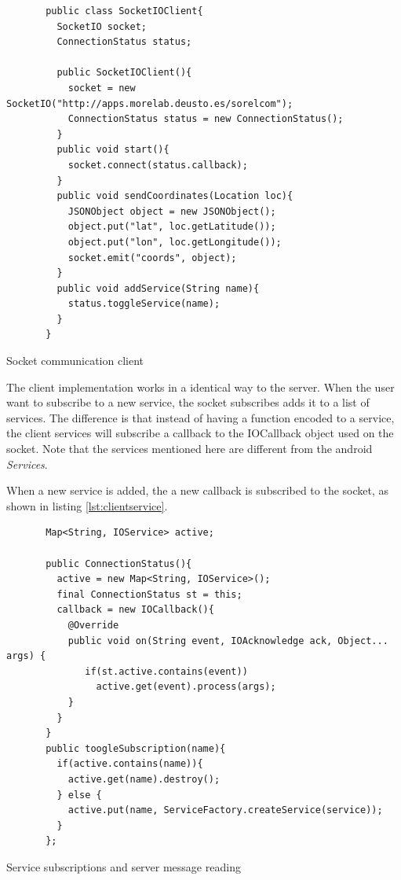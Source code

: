 \begin{listing}[ht]\centering
  \begin{minipage}{.8\textwidth}
    \begin{verbatim}
       public class SocketIOClient{
         SocketIO socket;      
         ConnectionStatus status;
        
         public SocketIOClient(){
           socket = new SocketIO("http://apps.morelab.deusto.es/sorelcom");
           ConnectionStatus status = new ConnectionStatus();
         }
         public void start(){
           socket.connect(status.callback);
         }
         public void sendCoordinates(Location loc){
           JSONObject object = new JSONObject();
           object.put("lat", loc.getLatitude());
           object.put("lon", loc.getLongitude());
           socket.emit("coords", object);
         }         
         public void addService(String name){
           status.toggleService(name);
         }
       }
    \end{verbatim}
  \end{minipage}
  \caption{Socket communication client}\label{lst:socketclient}
\end{listing}

The client implementation works in a identical way to the server. When the user want to subscribe to a new service, the socket subscribes adds it to a list of services. The difference is that instead of having a function encoded to a service, the client services will subscribe a callback to the IOCallback object used on the socket. Note that the services mentioned here are different from the android \textit{Services}.

When a new service is added, the a new callback is subscribed to the socket, as shown in listing \ref{lst:clientservice}.

\begin{listing}[ht]\centering
  \begin{minipage}{.8\textwidth}
    \begin{verbatim}
       Map<String, IOService> active;
       
       public ConnectionStatus(){
         active = new Map<String, IOService>();
         final ConnectionStatus st = this;
         callback = new IOCallback(){
           @Override
           public void on(String event, IOAcknowledge ack, Object... args) {
              if(st.active.contains(event))
                active.get(event).process(args);
           }
         }
       }
       public toogleSubscription(name){
         if(active.contains(name)){
           active.get(name).destroy();
         } else {
           active.put(name, ServiceFactory.createService(service));
         }
       };
    \end{verbatim}
  \end{minipage}
  \caption{Service subscriptions and server message reading}\label{lst:clientservice}
\end{listing}


